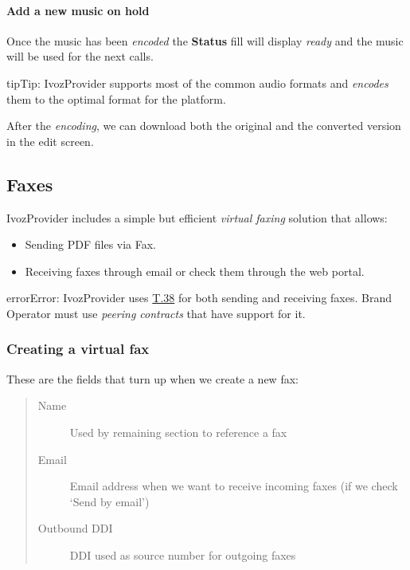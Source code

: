 \documentclass[letterpaper,10pt,english]{sphinxmanual}
\begin{document}
\paragraph{Add a new music on hold}

Once the music has been \emph{encoded} the \textbf{Status} fill will display \emph{ready} and
the music will be used for the next calls.

\begin{notice}{tip}{Tip:}
IvozProvider supports most of the common audio formats and \emph{encodes}
them to the optimal format for the platform.
\end{notice}

After the \emph{encoding}, we can download both the original and the converted
version in the edit screen.
\label{administration_portal/client/vpbx/faxes:faxing-system}

\subsection{Faxes}
\label{administration_portal/client/vpbx/faxes:faxes}\label{administration_portal/client/vpbx/faxes::doc}\label{administration_portal/client/vpbx/faxes:faxing-system}\label{administration_portal/client/vpbx/faxes:id1}
IvozProvider includes a simple but efficient \emph{virtual faxing} solution that allows:
\begin{itemize}
\item {} 
Sending PDF files via Fax.

\item {} 
Receiving faxes through email or check them through the web portal.

\end{itemize}

\begin{notice}{error}{Error:}
IvozProvider uses
\href{http://www.voip-info.org/wiki/view/T.38}{T.38} for both sending and receiving
faxes. Brand Operator must use \emph{peering contracts} that have support for it.
\end{notice}


\subsubsection{Creating a virtual fax}
\label{administration_portal/client/vpbx/faxes:creating-a-virtual-fax}
These are the fields that turn up when we create a new fax:
\begin{quote}
\begin{description}
\item[{Name}] \leavevmode
Used by remaining section to reference a fax

\item[{Email}] \leavevmode
Email address when we want to receive incoming faxes (if we check `Send
by email')

\item[{Outbound DDI}] \leavevmode
DDI used as source number for outgoing faxes

\end{description}
\end{quote}
\end{document}
